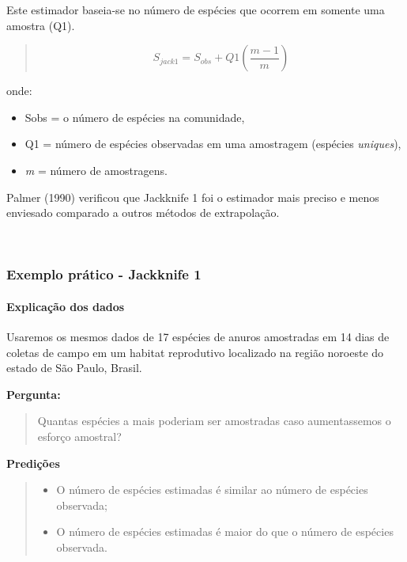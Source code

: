 \documentclass[
]{book}
\providecommand{\tightlist}{%
  \setlength{\itemsep}{0pt}\setlength{\parskip}{0pt}}
\begin{document}
Este estimador baseia-se no número de espécies que ocorrem em somente uma amostra (Q1).

\begin{quote}
\[S_{jack1} = S_{obs} + Q1\left(\frac{m - 1}{m}\right)\]
\end{quote}

onde:

\begin{itemize}
\item
  Sobs = o número de espécies na comunidade,
\item
  Q1 = número de espécies observadas em uma amostragem (espécies \emph{uniques}),
\item
  \emph{m} = número de amostragens.
\end{itemize}

Palmer (1990) verificou que Jackknife 1 foi o estimador mais preciso e menos enviesado comparado a outros métodos de extrapolação.

~

\hypertarget{exemplo-pruxe1tico---jackknife-1}{%
\subsubsection{Exemplo prático - Jackknife 1}\label{exemplo-pruxe1tico---jackknife-1}}

\hypertarget{explicauxe7uxe3o-dos-dados-3}{%
\paragraph{Explicação dos dados}\label{explicauxe7uxe3o-dos-dados-3}}

Usaremos os mesmos dados de 17 espécies de anuros amostradas em 14 dias de coletas de campo em um habitat reprodutivo localizado na região noroeste do estado de São Paulo, Brasil.

\textbf{Pergunta:}

\begin{quote}
Quantas espécies a mais poderiam ser amostradas caso aumentassemos o esforço amostral?
\end{quote}

\textbf{Predições}

\begin{quote}
\begin{itemize}
\tightlist
\item
  O número de espécies estimadas é similar ao número de espécies observada;
\item
  O número de espécies estimadas é maior do que o número de espécies observada.
\end{itemize}
\end{quote}
\end{document}
